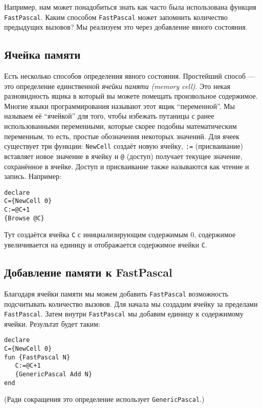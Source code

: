 Например, нам может понадобиться знать как часто была использована функция \lstinline|FastPascal|. Каким способом \lstinline|FastPascal| может запомнить количество предыдущих вызовов? Мы реализуем это через добавление явного состояния.

\subsection{Ячейка памяти}

Есть несколько способов определения явного состояния. Простейший способ --- это определение единственной \emph{ячейки памяти (memory cell)}. Это некая разновидность ящика в который вы можете помещать произвольное содержимое. Многие языки программирования называют этот ящик ``переменной''. Мы называем её ``ячейкой'' для того, чтобы избежать путаницы с ранее использованными переменными, которые скорее подобны математическим переменным, то есть, простые обозначения некоторых значений. Для ячеек существует три функции: \lstinline|NewCell| создаёт новую ячейку, \lstinline|:=| (присваивание) вставляет новое значение в ячейку и \lstinline|@| (доступ) получает текущее значение, сохранённое в ячейке. Доступ и присваивание также называются как чтение и запись. Например:

\begin{lstlisting}
declare
C={NewCell 0}
C:=@C+1
{Browse @C}
\end{lstlisting}

Тут создаётся ячейка \lstinline|C| с инициализирующим содержимым $0$, содержимое увеличивается на единицу и отображается содержимое ячейки \lstinline|C|.

\subsection{Добавление памяти к FastPascal}

Благодаря ячейки памяти мы можем добавить \lstinline|FastPascal| возможность подсчитывать количество вызовов. Для начала мы создадим ячейку за пределами \lstinline|FastPascal|. Затем внутри \lstinline|FastPascal| мы добавим единицу к содержимому ячейки. Результат будет таким:

\begin{lstlisting}
declare
C={NewCell 0}
fun {FastPascal N}
   C:=@C+1
   {GenericPascal Add N}
end
\end{lstlisting}

(Ради сокращения это определение использует \lstinline|GenericPascal|.)

